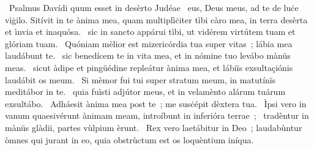 {~Psalmus Davídi quum esset in desèrto Judéae}
{%
~eus, Deus meus, ad te de luċe vìġilo. Sitívit in te ànima mea, quam multiplìċiter tìbi càro mea, in terra desèrta et ìnvia et inaquósa.
~sic in sancto appárui tìbi, ut vidérem virtútem tuam et glóriam tuam.
~Quóniam mèlior est mizericórdia tua super vitas~; lábia mea laudábunt te.
~sic benedícem te in vita mea, et in nómine tuo levábo mànüs meas.
~sicut àdipe et pingüédine repleátur ànima mea, et lábiïs exsultaçiónis laudábit os meum.
~Si mèmor fui tui super stratum meum, in matutínïs meditábor in te.
~quia fuìsti adjútor meus, et in velamènto alárum tuárum exsultábo.
~Adháesit ànima mea post te~; me susċépit dèxtera tua.
~Ìpsi vero in vanum quaesivérunt ànimam meam, introíbunt in inferióra terrae~;
~tradèntur in mànüs glàdii, partes vùlpium èrunt.
~Rex vero laetábitur in Deo~; laudabùntur òmnes qui jurant in eo, quia obstrùctum est os loquèntium iníqua.
}

